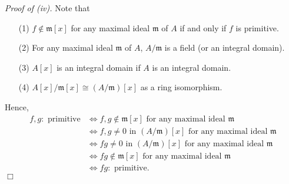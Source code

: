 \documentclass{article}
\begin{document}
\emph{Proof of (iv).}
Note that
\begin{enumerate}
\item[(1)]
$f \notin \mathfrak{m}[x]$ for any maximal ideal $\mathfrak{m}$ of $A$
if and only if $f$ is primitive.
\item[(2)]
For any maximal ideal $\mathfrak{m}$ of $A$,
$A/\mathfrak{m}$ is a field (or an integral domain).
\item[(3)]
$A[x]$ is an integral domain if $A$ is an integral domain.
\item[(4)]
$A[x]/\mathfrak{m}[x] \cong (A/\mathfrak{m})[x]$ as a ring isomorphism.
\end{enumerate}
Hence,
\begin{align*}
f, g:\text{ primitive}
&\Longleftrightarrow
f, g \notin \mathfrak{m}[x] \text{ for any maximal ideal } \mathfrak{m} \\
&\Longleftrightarrow
f, g \neq 0 \text{ in } (A/\mathfrak{m})[x] \text{ for any maximal ideal } \mathfrak{m} \\
&\Longleftrightarrow
fg \neq 0 \text{ in } (A/\mathfrak{m})[x] \text{ for any maximal ideal } \mathfrak{m} \\
&\Longleftrightarrow
fg \notin \mathfrak{m}[x] \text{ for any maximal ideal } \mathfrak{m} \\
&\Longleftrightarrow
fg:\text{ primitive}.
\end{align*}
$\Box$ \\\\
\end{document}
